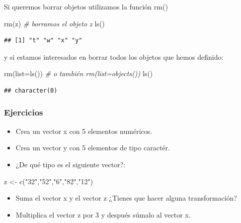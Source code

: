 \documentclass[
]{book}
\newenvironment{Shaded}{\begin{snugshade}}{\end{snugshade}}
\newcommand{\AttributeTok}[1]{\textcolor[rgb]{0.77,0.63,0.00}{#1}}
\newcommand{\CommentTok}[1]{\textcolor[rgb]{0.56,0.35,0.01}{\textit{#1}}}
\newcommand{\FunctionTok}[1]{\textcolor[rgb]{0.00,0.00,0.00}{#1}}
\newcommand{\NormalTok}[1]{#1}
\newcommand{\OtherTok}[1]{\textcolor[rgb]{0.56,0.35,0.01}{#1}}
\newcommand{\StringTok}[1]{\textcolor[rgb]{0.31,0.60,0.02}{#1}}
\providecommand{\tightlist}{%
  \setlength{\itemsep}{0pt}\setlength{\parskip}{0pt}}
\begin{document}
Si queremos borrar objetos utilizamos la función rm()

\begin{Shaded}
\begin{Highlighting}[]
\FunctionTok{rm}\NormalTok{(z)  }\CommentTok{\# borramos el objeto z}
\FunctionTok{ls}\NormalTok{()}
\end{Highlighting}
\end{Shaded}

\begin{verbatim}
## [1] "t" "w" "x" "y"
\end{verbatim}

y si estamos interesados en borrar todos los objetos que hemos definido:

\begin{Shaded}
\begin{Highlighting}[]
\FunctionTok{rm}\NormalTok{(}\AttributeTok{list=}\FunctionTok{ls}\NormalTok{()) }\CommentTok{\# o también rm(list=objects())}
\FunctionTok{ls}\NormalTok{()}
\end{Highlighting}
\end{Shaded}

\begin{verbatim}
## character(0)
\end{verbatim}

\hypertarget{ejercicios}{%
\subsubsection{Ejercicios}\label{ejercicios}}

\begin{itemize}
\tightlist
\item
  Crea un vector x con 5 elementos numéricos.
\item
  Crea un vector y con 5 elementos de tipo caractér.
\item
  ¿De qué tipo es el siguiente vector?:
\end{itemize}

\begin{Shaded}
\begin{Highlighting}[]
\NormalTok{z }\OtherTok{\textless{}{-}} \FunctionTok{c}\NormalTok{(}\StringTok{"32"}\NormalTok{,}\StringTok{"52"}\NormalTok{,}\StringTok{"6"}\NormalTok{,}\StringTok{"82"}\NormalTok{,}\StringTok{"12"}\NormalTok{)}
\end{Highlighting}
\end{Shaded}

\begin{itemize}
\tightlist
\item
  Suma el vector x y el vector z ¿Tienes que hacer alguna transformación?
\item
  Multiplica el vector z por 3 y después súmalo al vector x.
\end{itemize}
\end{document}
